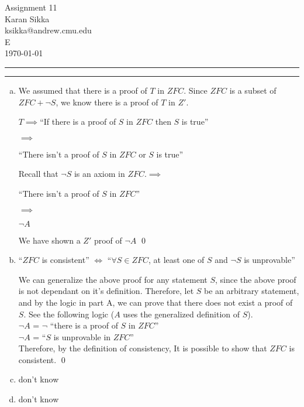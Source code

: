 \documentclass[11pt]{article}
\makeatletter
\newcounter{questionCounter}
\newcounter{partCounter}[questionCounter]
\newenvironment{question}[2][\arabic{questionCounter}]{%
    \setcounter{partCounter}{0}%
    \vspace{.25in} \hrule \vspace{0.5em}%
        \noindent{\bf #2}%
    \vspace{0.8em} \hrule \vspace{.10in}%
    \addtocounter{questionCounter}{1}%
}{}
\newcommand{\myname}{Karan Sikka}
\newcommand{\myandrew}{ksikka@andrew.cmu.edu}
\newcommand{\myhwname}{Assignment 11}
\newcommand{\myrecitation}{E}
\makeatother
\begin{document}
\thispagestyle{plain}

\begin{center}
{\Large \myhwname} \\
\myname \\
\myandrew \\
\myrecitation \\
\today
\end{center}
\begin{question}{The ZFCs Are Alive}
\begin{enumerate}[a)]
\item
We assumed that there is a proof of $T$ in $ZFC$. Since $ZFC$ is a subset of $ZFC+\neg S$,
we know there is a proof of $T$ in $Z'$.
\begin{center}$T\implies$``If there is a proof of $S$ in $ZFC$ then $S$ is true''\end{center}
$\implies$\begin{center}``There isn't a proof of $S$ in $ZFC$ or $S$ is true''\end{center}
Recall that $\neg S$ is an axiom in $ZFC$.$\implies$
\begin{center}``There isn't a proof of $S$ in $ZFC$''\end{center}
$\implies$\begin{center}$\neg A$\end{center}

We have shown a $Z'$ proof of $\neg A$ \qed

\item
``$ZFC$ is consistent'' $\iff$ ``$\forall S \in ZFC$, at least one of $S$ and
$\neg S$ is unprovable''

We can generalize the above proof for any statement $S$, since the above proof
is not dependant on it's definition. Therefore, let $S$ be an arbitrary statement,
and by the logic in part A, we can prove that there does not exist a proof of $S$.
See the following logic ($A$ uses the generalized definition of $S$).\\
$\neg A$ = $\neg$ ``there is a proof of $S$ in $ZFC$''\\
$\neg A$ = ``$S$ is unprovable in $ZFC$''\\

Therefore, by the definition of consistency, It is possible to show that $ZFC$ is consistent. \qed

\item don't know
\item don't know

\end{enumerate}


\end{question}
\end{document}
